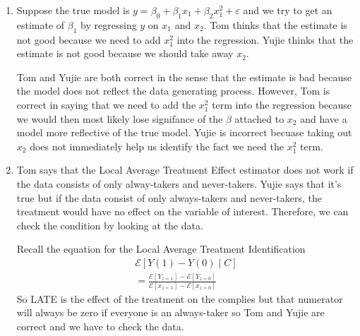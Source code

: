 \documentclass[11pt]{SelfArxOneColBMN}
\begin{document}
\begin{enumerate}
  \item Suppose the true model is $y = \beta_0 + \beta_1x_1 + \beta_2x_1^2 + \varepsilon$ and we try to get an estimate of $\beta_1$ by regressing $y$ on $x_1$ and $x_2$. Tom thinks that the estimate is not good because we need to add $x_1^2$ into the regression. Yujie thinks that the estimate is not good because we should take away $x_2$.

  \begin{solution}
    Tom and Yujie are both correct in the sense that the estimate is bad because the model does not reflect the data generating process. However, Tom is correct in saying that we need to add the $x_1^2$ term into the regression because we would then most likely lose signifance of the $\beta$ attached to $x_2$ and have a model more reflective of the true model. Yujie is incorrect becuase taking out $x_2$ does not immediately help us identify the fact  we need the $x_1^2$ term.
  \end{solution}

  \item Tom says that the Local Average Treatment Effect estimator does not work if the data consists of only alway-takers and never-takers. Yujie says that it's true but if the data consist of only always-takers and never-takers, the treatment would have no effect on the variable of interest. Therefore, we can check the condition by looking at the data.

  \begin{solution}
    Recall the equation for the Local Average Treatment Identification
    \begin{eqnarray*}
      \mathcal{E}[Y(1) - Y(0)\;|\;C]\\
      = \frac{\mathcal{E}[Y_{z = 1}] - \mathcal{E}[Y_{z = 0}]}{\mathcal{E}[x_{z = 1}] - \mathcal{E}[x_{z = 0}]}
    \end{eqnarray*}
    So LATE is the effect of the treatment on the complies but that numerator will always be zero if everyone is an always-taker so Tom and Yujie are correct and we have to check the data. 
  \end{solution}
\end{enumerate}
\end{document}
